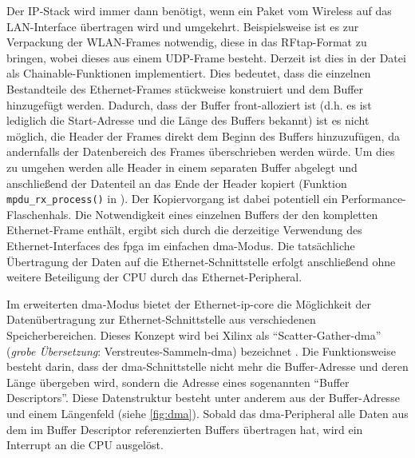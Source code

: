 \documentclass[letterpaper,11pt,ngerman]{article}
\begin{document}
\begin{onehalfspace}
Der IP-Stack wird immer dann benötigt, wenn ein Paket vom Wireless auf
das LAN-Interface übertragen wird und umgekehrt. Beispielsweise ist es
zur Verpackung der WLAN-Frames notwendig, diese in das RFtap-Format zu
bringen, wobei dieses aus einem UDP-Frame besteht. Derzeit ist dies in
der Datei  als
Chainable-Funktionen implementiert. Dies bedeutet, dass die einzelnen
Bestandteile des Ethernet-Frames stückweise konstruiert und dem Buffer
hinzugefügt werden. Dadurch, dass der Buffer front-alloziert ist (d.h.
es ist lediglich die Start-Adresse und die Länge des Buffers bekannt)
ist es nicht möglich, die Header der Frames direkt dem Beginn des
Buffers hinzuzufügen, da andernfalls der Datenbereich des Frames
überschrieben werden würde. Um dies zu umgehen werden alle Header in
einem separaten Buffer abgelegt und anschließend der Datenteil an das
Ende der Header kopiert (Funktion \texttt{mpdu\_rx\_process()} in
). Der
Kopiervorgang ist dabei potentiell ein Performance-Flaschenhals. Die
Notwendigkeit eines einzelnen Buffers der den kompletten Ethernet-Frame
enthält, ergibt sich durch die derzeitige Verwendung des
Ethernet-Interfaces des \ac{fpga} im einfachen \ac{dma}-Modus. Die
tatsächliche Übertragung der Daten auf die Ethernet-Schnittstelle
erfolgt anschließend ohne weitere Beteiligung der CPU durch das
Ethernet-Peripheral.

Im erweiterten \ac{dma}-Modus bietet der Ethernet-\ac{ip-core} die
Möglichkeit der Datenübertragung zur Ethernet-Schnittstelle aus
verschiedenen Speicherbereichen. Dieses Konzept wird bei Xilinx als
``Scatter-Gather-\ac{dma}'' (\emph{grobe Übersetzung}:
Verstreutes-Sammeln-\ac{dma}) bezeichnet
\autocite{xilinx-ethernet-core}. Die Funktionsweise besteht darin, dass
der \ac{dma}-Schnittstelle nicht mehr die Buffer-Adresse und deren Länge
übergeben wird, sondern die Adresse eines sogenannten ``Buffer
Descriptors''. Diese Datenstruktur besteht unter anderem aus der
Buffer-Adresse und einem Längenfeld (siehe \cref{fig:dma}).
Sobald das \ac{dma}-Peripheral alle Daten aus dem im Buffer Descriptor
referenzierten Buffers übertragen hat, wird ein Interrupt an die CPU ausgelöst.


\end{onehalfspace}
\end{document}
